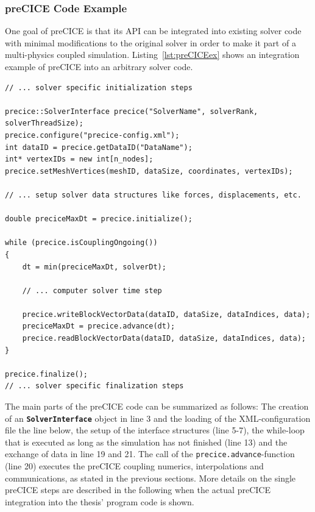   \subsubsection{preCICE Code Example}\label{sec:Coupl-Impl-Example}
   One goal of preCICE is that its API can be integrated into existing solver code with minimal modifications to the original solver in order to make it part of a multi-physics coupled simulation. Listing~\ref{lst:preCICEex} shows an integration example of preCICE into an arbitrary solver code.
\begin{lstlisting}[caption=preCICE Integration Example,label=lst:preCICEex,keepspaces=true]
// ... solver specific initialization steps

precice::SolverInterface precice("SolverName", solverRank, solverThreadSize);
precice.configure("precice-config.xml");
int dataID = precice.getDataID("DataName");
int* vertexIDs = new int[n_nodes];
precice.setMeshVertices(meshID, dataSize, coordinates, vertexIDs);

// ... setup solver data structures like forces, displacements, etc.

double preciceMaxDt = precice.initialize();

while (precice.isCouplingOngoing())
{
	dt = min(preciceMaxDt, solverDt);

	// ... computer solver time step

	precice.writeBlockVectorData(dataID, dataSize, dataIndices, data);
	preciceMaxDt = precice.advance(dt);
	precice.readBlockVectorData(dataID, dataSize, dataIndices, data);
}

precice.finalize();
// ... solver specific finalization steps
\end{lstlisting}
   The main parts of the preCICE code can be summarized as follows: The creation of an \texttt{\textbf{SolverInterface}} object in line 3 and the loading of the XML-configuration file the line below, the setup of the interface structures (line 5-7), the while-loop that is executed as long as the simulation has not finished (line 13) and the exchange of data in line 19 and 21. The call of the \texttt{precice.advance}-function (line 20) executes the preCICE coupling numerics, interpolations and communications, as stated in the previous sections. More details on the single preCICE steps are described in the following when the actual preCICE integration into the thesis' program code is shown.
   
